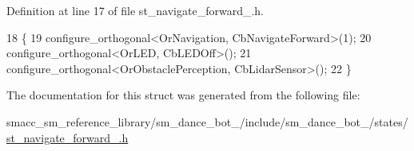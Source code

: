 Definition at line 17 of file st\+\_\+navigate\+\_\+forward\+\_.\+h.


\begin{DoxyCode}
18   \{
19     configure\_orthogonal<OrNavigation, CbNavigateForward>(1);
20     configure\_orthogonal<OrLED, CbLEDOff>();
21     configure\_orthogonal<OrObstaclePerception, CbLidarSensor>();
22   \}
\end{DoxyCode}


The documentation for this struct was generated from the following file\+:\begin{DoxyCompactItemize}
\item 
smacc\+\_\+sm\+\_\+reference\+\_\+library/sm\+\_\+dance\+\_\+bot\+\_/include/sm\+\_\+dance\+\_\+bot\+\_/states/\hyperlink{3_2include_2sm__dance__bot__3_2states_2st__navigate__forward__2_8h}{st\+\_\+navigate\+\_\+forward\+\_.\+h}\end{DoxyCompactItemize}
